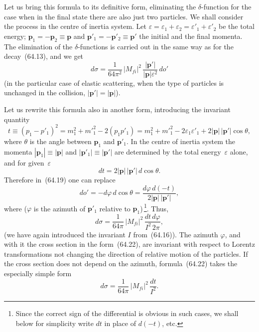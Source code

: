 Let us bring this formula to its definitive form, eliminating the $\delta$-function for the case when in the final state there are also just two particles. We shall consider the process in the centre of inertia system. Let $\varepsilon = \varepsilon_1 + \varepsilon_2 = \varepsilon'_1 + \varepsilon'_2$ be the total energy; $\mathbf{p}_1 = -\mathbf{p}_2 \equiv \mathbf{p}$ and $\mathbf{p}'_1 = -\mathbf{p}'_2 \equiv \mathbf{p}'$ the initial and the final momenta. The elimination of the $\delta$-functions is carried out in the same way as for the decay~(64.13), and we get
\begin{equation}
d\sigma = \frac{1}{64\pi^2}\,|M_{fi}|^2\,\frac{|\mathbf{p}'|}{|\mathbf{p}|\varepsilon^2}\,do'
\tag{64.19}
\end{equation}
(in the particular case of elastic scattering, when the type of particles is unchanged in the collision, $|\mathbf{p}'| = |\mathbf{p}|$).

Let us rewrite this formula also in another form, introducing the invariant quantity
\begin{equation}
t \equiv (p_1 - p'_1)^2 = m^2_1 + m'^2_1 - 2(p_1 p'_1) =
m^2_1 + m'^2_1 - 2\varepsilon_1\varepsilon'_1 + 2|\mathbf{p}|\,|\mathbf{p}'|\cos\theta,
\tag{64.20}
\end{equation}
where $\theta$ is the angle between $\mathbf{p}_1$ and $\mathbf{p}'_1$. In the centre of inertia system the momenta $|\mathbf{p}_1| \equiv |\mathbf{p}|$ and $|\mathbf{p}'_1| \equiv |\mathbf{p}'|$ are determined by the total energy~$\varepsilon$ alone, and for given~$\varepsilon$
\begin{equation}
dt = 2|\mathbf{p}|\,|\mathbf{p}'|\,d\cos\theta.
\tag{64.21}
\end{equation}
Therefore in~(64.19) one can replace
\[
do' = -d\varphi\,d\cos\theta = \frac{d\varphi\,d(-t)}{2|\mathbf{p}|\,|\mathbf{p}'|},
\]
where ($\varphi$ is the azimuth of $\mathbf{p}'_1$ relative to $\mathbf{p}_1$)\,\footnote{Since the correct sign of the differential is obvious in such cases, we shall below for simplicity write $dt$ in place of $d(-t)$, etc.}. Thus,
\begin{equation}
d\sigma = \frac{1}{64\pi}\,|M_{fi}|^2\,\frac{dt\,d\varphi}{I^2\,2\pi},
\tag{64.22}
\end{equation}
(we have again introduced the invariant $I$ from~(64.16)). The azimuth $\varphi$, and with it the cross section in the form~(64.22), are invariant with respect to Lorentz transformations not changing the direction of relative motion of the particles. If the cross section does not depend on the azimuth, formula~(64.22) takes the especially simple form
\begin{equation}
d\sigma = \frac{1}{64\pi}\,|M_{fi}|^2\,\frac{dt}{I^2}.
\tag{64.23}
\end{equation}


